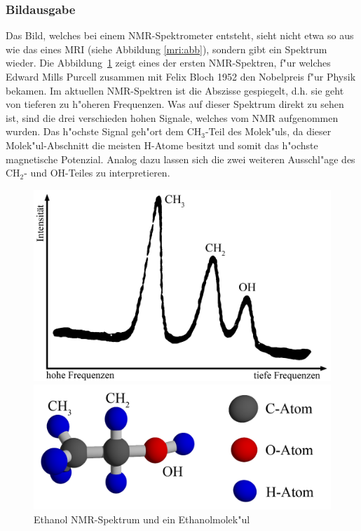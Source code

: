 \subsubsection{Bildausgabe}
Das Bild, welches bei einem NMR-Spektrometer entsteht, sieht nicht
etwa so aus wie das eines MRI (siehe Abbildung \ref{mri:abb}),
sondern gibt ein Spektrum wieder. Die
Abbildung~\ref{mri:bsp:abb:Etanolspektrum} zeigt eines der ersten
NMR-Spektren, f"ur welches Edward Mills Purcell zusammen mit Felix
Bloch 1952 den Nobelpreis f"ur Physik bekamen. Im aktuellen
NMR-Spektren ist die Abszisse gespiegelt, d.h. sie geht von tieferen
zu h"oheren Frequenzen. Was auf dieser Spektrum direkt zu sehen
ist, sind die drei verschieden hohen Signale, welches vom NMR
aufgenommen wurden. Das h"ochste Signal geh"ort dem $\mathrm{CH_3}$-Teil
des Molek"uls, da dieser Molek"ul-Abschnitt die meisten H-Atome
besitzt und somit das h"ochste magnetische Potenzial. Analog dazu
lassen sich die zwei weiteren Ausschl"age des $\mathrm{CH_2}$- und
OH-Teiles zu interpretieren.
\begin{figure}
	\centering
	\begin{minipage}{0.55\textwidth}
		\includegraphics[width = \textwidth]{./mri/pic/CW_SpektrumEthanol.jpg}
	\end{minipage}
	\begin{minipage}{0.42\textwidth}
		\includegraphics[width = \textwidth]{./mri/pic/Ethanol.png}
	\end{minipage}
	\caption{Ethanol NMR-Spektrum \cite{skript:mri:NMRSkopie} und ein Ethanolmolek"ul}
	\label{mri:bsp:abb:Etanolspektrum}
\end{figure}
